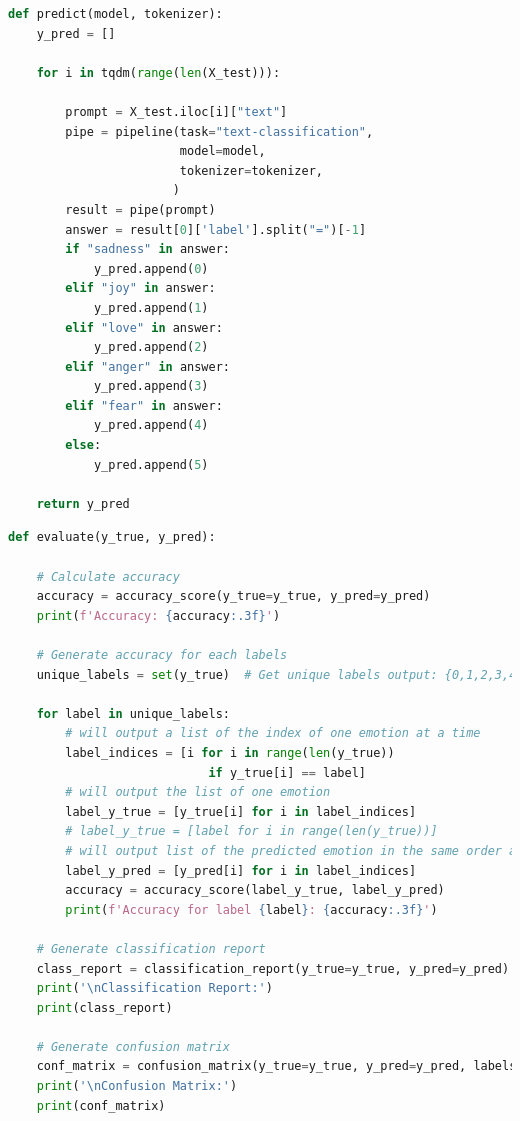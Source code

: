 \begin{lstlisting}[language=Python, caption=The code for predict function implemented, label=lst:predict_func]
    def predict(model, tokenizer):
    y_pred = []

    for i in tqdm(range(len(X_test))):

        prompt = X_test.iloc[i]["text"]
        pipe = pipeline(task="text-classification",
                        model=model,
                        tokenizer=tokenizer,
                       )
        result = pipe(prompt)
        answer = result[0]['label'].split("=")[-1]
        if "sadness" in answer:
            y_pred.append(0)
        elif "joy" in answer:
            y_pred.append(1)
        elif "love" in answer:
            y_pred.append(2)
        elif "anger" in answer:
            y_pred.append(3)
        elif "fear" in answer:
            y_pred.append(4)
        else:
            y_pred.append(5)

    return y_pred
\end{lstlisting}

\begin{lstlisting}[language=Python, caption=The code for evaluate function implemented, label=lst:evaluate_func]
def evaluate(y_true, y_pred):

    # Calculate accuracy
    accuracy = accuracy_score(y_true=y_true, y_pred=y_pred)
    print(f'Accuracy: {accuracy:.3f}')

    # Generate accuracy for each labels
    unique_labels = set(y_true)  # Get unique labels output: {0,1,2,3,4,5}

    for label in unique_labels:
        # will output a list of the index of one emotion at a time
        label_indices = [i for i in range(len(y_true))
                            if y_true[i] == label]
        # will output the list of one emotion
        label_y_true = [y_true[i] for i in label_indices]
        # label_y_true = [label for i in range(len(y_true))]
        # will output list of the predicted emotion in the same order as label_y_true
        label_y_pred = [y_pred[i] for i in label_indices]
        accuracy = accuracy_score(label_y_true, label_y_pred)
        print(f'Accuracy for label {label}: {accuracy:.3f}')

    # Generate classification report
    class_report = classification_report(y_true=y_true, y_pred=y_pred)
    print('\nClassification Report:')
    print(class_report)

    # Generate confusion matrix
    conf_matrix = confusion_matrix(y_true=y_true, y_pred=y_pred, labels=['sadness', 'joy', 'love', 'anger', 'fear', 'surprise'])
    print('\nConfusion Matrix:')
    print(conf_matrix)
\end{lstlisting}